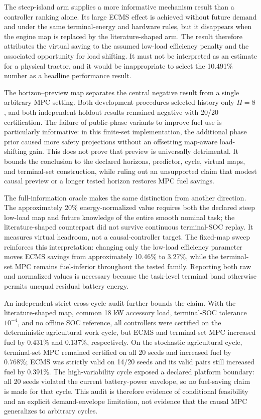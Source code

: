 \documentclass[energies,article,submit,moreauthors]{Definitions/mdpi}
\begin{document}
The steep-island arm supplies a more informative mechanism result than a controller ranking alone. Its large ECMS effect is achieved without future demand and under the same terminal-energy and hardware rules, but it disappears when the engine map is replaced by the literature-shaped arm. The result therefore attributes the virtual saving to the assumed low-load efficiency penalty and the associated opportunity for load shifting. It must not be interpreted as an estimate for a physical tractor, and it would be inappropriate to select the 10.491\% number as a headline performance result.

The horizon--preview map separates the central negative result from a single arbitrary MPC setting. Both development procedures selected history-only $H=8$, and both independent holdout results remained negative with 20/20 certification. The failure of public-phase variants to improve fuel use is particularly informative: in this finite-set implementation, the additional phase prior caused more safety projections without an offsetting map-aware load-shifting gain. This does not prove that preview is universally detrimental. It bounds the conclusion to the declared horizons, predictor, cycle, virtual maps, and terminal-set construction, while ruling out an unsupported claim that modest causal preview or a longer tested horizon restores MPC fuel savings.

The full-information oracle makes the same distinction from another direction. The approximately 20\% energy-normalized value requires both the declared steep low-load map and future knowledge of the entire smooth nominal task; the literature-shaped counterpart did not survive continuous terminal-SOC replay. It measures virtual headroom, not a causal-controller target. The fixed-map sweep reinforces this interpretation: changing only the low-load efficiency parameter moves ECMS savings from approximately 10.46\% to 3.27\%, while the terminal-set MPC remains fuel-inferior throughout the tested family. Reporting both raw and normalized values is necessary because the task-level terminal band otherwise permits unequal residual battery energy.

An independent strict cross-cycle audit further bounds the claim. With the literature-shaped map, common 18 kW accessory load, terminal-SOC tolerance $10^{-4}$, and no offline SOC reference, all controllers were certified on the deterministic agricultural work cycle, but ECMS and terminal-set MPC increased fuel by 0.431\% and 0.137\%, respectively. On the stochastic agricultural cycle, terminal-set MPC remained certified on all 20 seeds and increased fuel by 0.768\%; ECMS was strictly valid on 14/20 seeds and its valid pairs still increased fuel by 0.391\%. The high-variability cycle exposed a declared platform boundary: all 20 seeds violated the current battery-power envelope, so no fuel-saving claim is made for that cycle. This audit is therefore evidence of conditional feasibility and an explicit demand-envelope limitation, not evidence that the causal MPC generalizes to arbitrary cycles.
\end{document}
